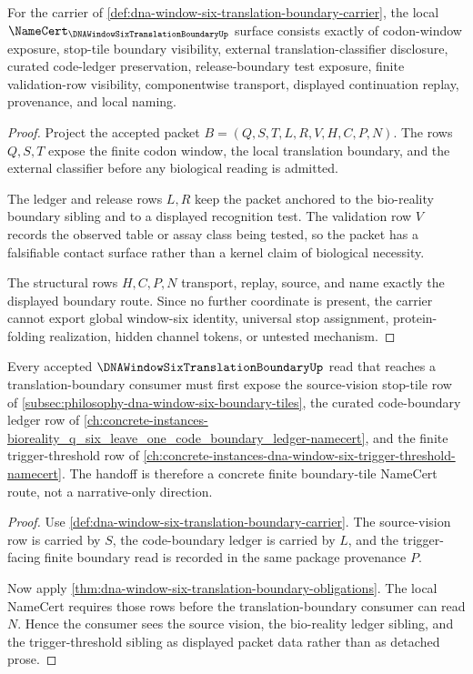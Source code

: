\begin{theorem}
\label{thm:dna-window-six-translation-boundary-obligations}
For the carrier of \autoref{def:dna-window-six-translation-boundary-carrier}, the local $\NameCert_{\DNAWindowSixTranslationBoundaryUp}$ surface consists exactly of codon-window exposure, stop-tile boundary visibility, external translation-classifier disclosure, curated code-ledger preservation, release-boundary test exposure, finite validation-row visibility, componentwise transport, displayed continuation replay, provenance, and local naming.
\end{theorem}
\begin{proof}
Project the accepted packet $B=(Q,S,T,L,R,V,H,C,P,N)$. The rows $Q,S,T$ expose the finite codon window, the local translation boundary, and the external classifier before any biological reading is admitted.

The ledger and release rows $L,R$ keep the packet anchored to the bio-reality boundary sibling and to a displayed recognition test. The validation row $V$ records the observed table or assay class being tested, so the packet has a falsifiable contact surface rather than a kernel claim of biological necessity.

The structural rows $H,C,P,N$ transport, replay, source, and name exactly the displayed boundary route. Since no further coordinate is present, the carrier cannot export global window-six identity, universal stop assignment, protein-folding realization, hidden channel tokens, or untested mechanism.
\end{proof}

\begin{theorem}
\label{thm:dna-window-six-translation-boundary-sibling-handoff}
Every accepted $\DNAWindowSixTranslationBoundaryUp$ read that reaches a translation-boundary consumer must first expose the source-vision stop-tile row of \autoref{subsec:philosophy-dna-window-six-boundary-tiles}, the curated code-boundary ledger row of \autoref{ch:concrete-instances-bioreality_q_six_leave_one_code_boundary_ledger-namecert}, and the finite trigger-threshold row of \autoref{ch:concrete-instances-dna-window-six-trigger-threshold-namecert}. The handoff is therefore a concrete finite boundary-tile NameCert route, not a narrative-only direction.
\end{theorem}
\begin{proof}
Use \autoref{def:dna-window-six-translation-boundary-carrier}. The source-vision row is carried by $S$, the code-boundary ledger is carried by $L$, and the trigger-facing finite boundary read is recorded in the same package provenance $P$.

Now apply \autoref{thm:dna-window-six-translation-boundary-obligations}. The local NameCert requires those rows before the translation-boundary consumer can read $N$. Hence the consumer sees the source vision, the bio-reality ledger sibling, and the trigger-threshold sibling as displayed packet data rather than as detached prose.
\end{proof}

